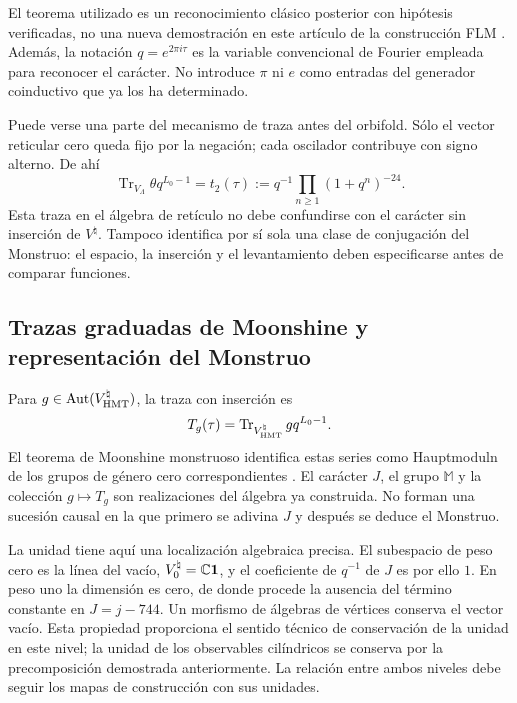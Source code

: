 El teorema utilizado es un reconocimiento clásico posterior con
hipótesis verificadas, no una nueva demostración en este artículo de
la construcción FLM \cite{flm}.
Además, la notación $q=e^{2\pi i\tau}$ es la variable convencional
de Fourier empleada para reconocer el carácter. No introduce $\pi$
ni $e$ como entradas del generador coinductivo que ya los ha determinado.

Puede verse una parte del mecanismo de traza antes del orbifold.
Sólo el vector reticular cero queda fijo por la negación; cada
oscilador contribuye con signo alterno. De ahí
\[
 \operatorname{Tr}_{V_\Lambda}\theta q^{L_0-1}
   =t_2(\tau)
   :=q^{-1}\prod_{n\geq1}(1+q^n)^{-24}.
\]
Esta traza en el álgebra de retículo no debe confundirse con el
carácter sin inserción de $V^\natural$. Tampoco identifica por sí
sola una clase de conjugación del Monstruo: el espacio, la inserción
y el levantamiento deben especificarse antes de comparar funciones.







\subsection{Trazas graduadas de Moonshine y representación del Monstruo}
\label{exc:alcance}

Para $g\in\operatorname{Aut}(V^\natural_{\rm HMT})$, la traza
con inserción es
\[
 T_g(\tau)=
 \operatorname{Tr}_{V^\natural_{\rm HMT}}gq^{L_0-1}.
\]
El teorema de Moonshine monstruoso identifica estas series como
Hauptmoduln de los grupos de género cero correspondientes
\cite[teorema~1.1]{borcherds}.
El carácter $J$, el grupo $\mathbb M$ y la colección $g\mapsto T_g$
son realizaciones del álgebra ya construida. No forman una sucesión
causal en la que primero se adivina $J$ y después se deduce el Monstruo.

La unidad tiene aquí una localización algebraica precisa. El subespacio
de peso cero es la línea del vacío, \(V^\natural_0=\mathbb C\mathbf1\), y
el coeficiente de \(q^{-1}\) de \(J\) es por ello \(1\). En peso uno
la dimensión es cero, de donde procede la ausencia del término constante
en \(J=j-744\). Un morfismo de álgebras de vértices conserva el vector
vacío. Esta propiedad proporciona el sentido técnico de conservación
de la unidad en este nivel; la unidad de los observables cilíndricos
se conserva por la precomposición demostrada anteriormente. La relación
entre ambos niveles debe seguir los mapas de construcción con sus unidades.

